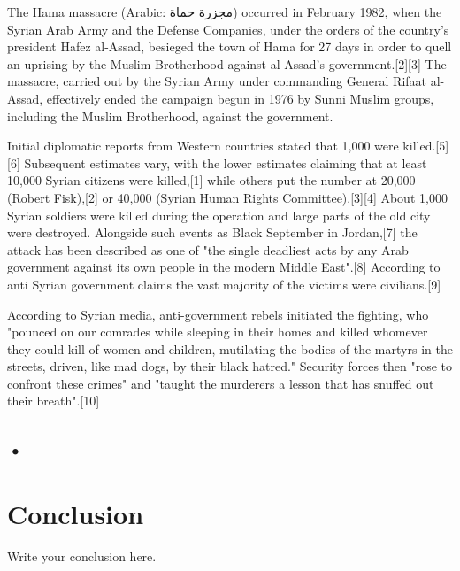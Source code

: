 \documentclass{article}
\begin{document}
The Hama massacre (Arabic: مجزرة حماة‎) occurred in February 1982, when the Syrian Arab Army and the Defense Companies, under the orders of the country's president Hafez al-Assad, besieged the town of Hama for 27 days in order to quell an uprising by the Muslim Brotherhood against al-Assad's government.[2][3] The massacre, carried out by the Syrian Army under commanding General Rifaat al-Assad, effectively ended the campaign begun in 1976 by Sunni Muslim groups, including the Muslim Brotherhood, against the government.

\vspace{5mm}

Initial diplomatic reports from Western countries stated that 1,000 were killed.[5][6] Subsequent estimates vary, with the lower estimates claiming that at least 10,000 Syrian citizens were killed,[1] while others put the number at 20,000 (Robert Fisk),[2] or 40,000 (Syrian Human Rights Committee).[3][4] About 1,000 Syrian soldiers were killed during the operation and large parts of the old city were destroyed. Alongside such events as Black September in Jordan,[7] the attack has been described as one of "the single deadliest acts by any Arab government against its own people in the modern Middle East".[8] According to anti Syrian government claims the vast majority of the victims were civilians.[9]

\vspace{5mm}

According to Syrian media, anti-government rebels initiated the fighting, who "pounced on our comrades while sleeping in their homes and killed whomever they could kill of women and children, mutilating the bodies of the martyrs in the streets, driven, like mad dogs, by their black hatred." Security forces then "rose to confront these crimes" and "taught the murderers a lesson that has snuffed out their breath".[10]

\subsection{•}
\section{Conclusion}
Write your conclusion here.
\end{document}
